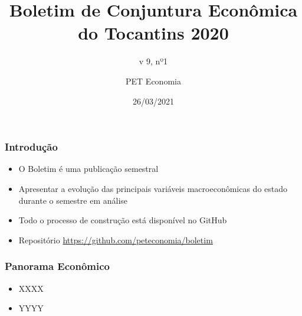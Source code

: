 \documentclass[12pt,aspectratio=169]{beamer}
\title{Boletim de Conjuntura Econômica do Tocantins 2020}
\subtitle{v 9, nº1}
\author{PET Economia}
\institute{Universidade Federal do Tocantins}
\date{26/03/2021}
\begin{document}
\begin{frame}
    \titlepage
\end{frame}


\begin{frame}  
\frametitle{Introdução}
\begin{itemize}
\item O Boletim é uma publicação semestral
\item Apresentar a evolução das principais variáveis macroeconômicas do estado durante o semestre em análise
\item Todo o processo de construção está disponível no GitHub
\item Repositório \url{https://github.com/peteconomia/boletim}

\end{itemize}
\end{frame}

\begin{frame}
    \frametitle{Panorama Econômico}
    \begin{itemize}
        \item XXXX
        \item YYYY
    \end{itemize}
\end{frame}
\end{document}
